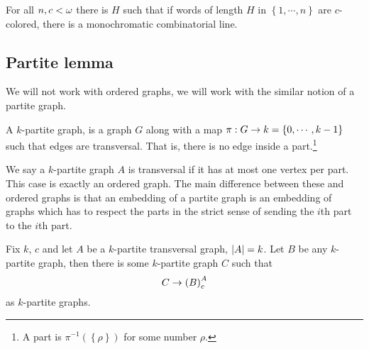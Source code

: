 \documentclass{amsart}
\begin{document}
\begin{thm}
For all $n,c < \omega$ there is $H$ such that if words of length $H$ in $\left\{ 1 , \cdots ,
n \right\}$ are $c$-colored, there is a monochromatic combinatorial line.
\end{thm}

\subsection{Partite lemma}

We will not work with ordered graphs, we will work with the similar notion of a partite graph. 

\begin{defn}
A $k$-partite graph, is a graph $G$ along with a map $\pi:G\rightarrow k = \left\{ 0 , \cdots
, k-1\right\}$ such that edges are transversal. That is, there is no edge inside
a part.\footnote{A part is $\pi^{-1}\left( \left\{ \rho \right\} \right)$ for some number
$\rho$.}
\end{defn}

We say a $k$-partite graph $A$ is transversal if it has at most one vertex per part.
This case is exactly an ordered graph.
The main difference between these and ordered graphs is that 
an embedding of a partite graph is an embedding of graphs which has to respect the
parts in the strict sense of sending the $i$th part to the $i$th part.

\begin{lem}
Fix $k$, $c$ and let $A$ be a $k$-partite transversal graph, $\left| A \right| = k$.
Let $B$ be any $k$-partite graph, then there is some $k$-partite graph $C$ such that
\begin{equation}
C\rightarrow \left( B \right)^A_c
\end{equation}
as $k$-partite graphs.
\end{lem}
\end{document}
